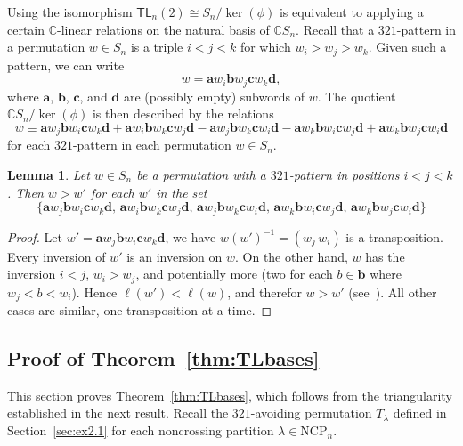 \documentclass[12pt]{amsart}
\newtheorem{lem}[equation]{Lemma}
\theoremstyle{definition}
\theoremstyle{remark}
\numberwithin{equation}{section}
\newcommand{\CC}{\mathbb{C}}
\newcommand{\TL}{\mathsf{TL}}
\newcommand{\NCP}{\mathrm{NCP}}
\begin{document}
Using the isomorphism $\TL_{n}(2)\cong S_n/\ker(\phi)$ is equivalent to applying a certain $\CC$-linear relations on the natural basis of $\CC S_{n}$.  
Recall that a $321$-pattern in a permutation $w \in S_{n}$ is a triple $i < j < k$ for which $w_{i} > w_{j} > w_{k}$.  Given such a pattern, we can write
\[
w = \mathbf{a}w_{i}\mathbf{b}w_{j}\mathbf{c}w_{k}\mathbf{d},
\]
where $\mathbf{a}$, $\mathbf{b}$, $\mathbf{c}$, and $\mathbf{d}$ are (possibly empty) subwords of $w$.  The quotient $\CC S_{n} / \ker(\phi)$ is then described by the relations
\begin{equation}
\label{eq:321relation}
w \equiv \mathbf{a}w_{j}\mathbf{b}w_{i}\mathbf{c}w_{k}\mathbf{d} + \mathbf{a}w_{i}\mathbf{b}w_{k}\mathbf{c}w_{j}\mathbf{d} - \mathbf{a}w_{j}\mathbf{b}w_{k}\mathbf{c}w_{i}\mathbf{d} - \mathbf{a}w_{k}\mathbf{b}w_{i}\mathbf{c}w_{j}\mathbf{d} + \mathbf{a}w_{k}\mathbf{b}w_{j}\mathbf{c}w_{i}\mathbf{d}
\end{equation}
for each $321$-pattern in each permutation $w \in S_{n}$.

\begin{lem}
Let $w \in S_{n}$ be a permutation with a $321$-pattern in positions $i < j < k$.  Then $w > w'$ for each $w'$ in the set
\[
\{
\mathbf{a}w_{j}\mathbf{b}w_{i}\mathbf{c}w_{k}\mathbf{d},  \,
\mathbf{a}w_{i}\mathbf{b}w_{k}\mathbf{c}w_{j}\mathbf{d}, \,
\mathbf{a}w_{j}\mathbf{b}w_{k}\mathbf{c}w_{i}\mathbf{d}, \,
\mathbf{a}w_{k}\mathbf{b}w_{i}\mathbf{c}w_{j}\mathbf{d}, \,
\mathbf{a}w_{k}\mathbf{b}w_{j}\mathbf{c}w_{i}\mathbf{d}
\}
\]
\end{lem}
\begin{proof}
Let $w'=\mathbf{a}w_{j}\mathbf{b}w_{i}\mathbf{c}w_{k}\mathbf{d}$, we have $w(w')^{-1}= (w_j\,w_i)$ is a transposition. 
Every inversion of $w'$ is an inversion on $w$. On the other hand, $w$ has the inversion $i<j$, $w_i>w_j$, and potentially more (two for each $b\in \mathbf{b}$ where $w_j<b<w_i$).
Hence $\ell(w')<\ell(w)$, and therefor $w>w'$ (see~\cite[Chapter 2]{BjornerBrenti}). All other cases are similar, one transposition at a time.
\end{proof}


\subsection{Proof of Theorem~\ref{thm:TLbases}}

This section proves Theorem~\ref{thm:TLbases}, which follows from the triangularity established in the next result.  Recall the $321$-avoiding permutation $T_{\lambda}$ defined in Section~\ref{sec:ex2.1} for each noncrossing partition $\lambda \in \NCP_{n}$.
\end{document}
